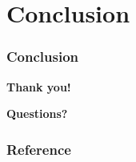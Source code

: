 \documentclass{beamer}
\begin{document}
\section{Conclusion}

\begin{frame}
  \frametitle{Conclusion}
\end{frame}


\begin{frame}[allowframebreaks]

  \begin{center}
    \textbf{Thank you!}
  \end{center}
  \begin{center}
    \textbf{Questions?}
  \end{center}
\end{frame}


\begin{frame}
  \frametitle{Reference}
  
  \tiny
  
  
\end{frame}
\end{document}
